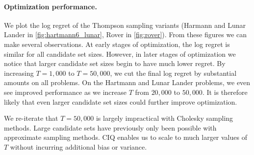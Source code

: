 \paragraph{Optimization performance.}
We plot the log regret of the Thompson sampling variants (Harmann and Lunar Lander in \cref{fig:hartmann6_lunar}, Rover in \cref{fig:rover}).
From these figures we can make several observations.
At early stages of optimization, the log regret is similar for all candidate set sizes.
However, in later stages of optimization we notice that larger candidate set sizes begin to have much lower regret.
By increasing $T=1,\!000$ to $T=50,\!000$, we cut the final log regret by substantial amounts on all problems.
On the Hartmann and Lunar Lander problems, we even see improved performance as we increase $T$ from $20,\!000$ to $50,\!000$.
It is therefore likely that even larger candidate set sizes could further improve optimization.

We re-iterate that $T=50,\!000$ is largely impractical with Cholesky sampling methods.
Large candidate sets have previously only been possible with approximate sampling methods.
CIQ enables us to scale to much larger values of $T$ without incurring additional bias or variance.
